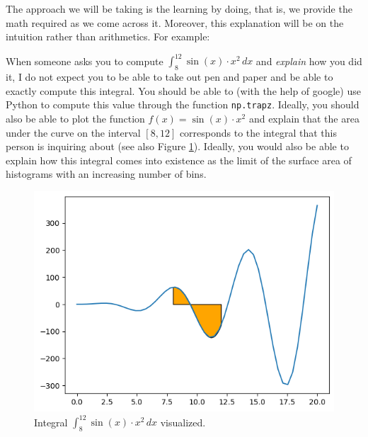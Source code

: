 \documentclass[10pt]{extarticle}
\newcommand{\<}{\langle}
\renewcommand{\>}{\rangle}
\theoremstyle{mystyle}{\newtheorem*{remark}{Remark}}
\theoremstyle{mystyle}{\newtheorem*{remarks}{Remarks}}
\theoremstyle{mystyle}{\newtheorem*{example}{Example}}
\theoremstyle{mystyle}{\newtheorem*{examples}{Examples}}
\theoremstyle{definition}{\newtheorem*{exercise}{Exercise}}
\theoremstyle{warn}
\begin{document}
\begin{remark}
The approach we will be taking is the learning by doing, that is, we provide the math required as we come across it. Moreover, this explanation will be on the intuition rather than arithmetics. For example:

When someone asks you to compute $\int_8^12 \sin(x) \cdot x^2 \, dx$ and \textit{explain} how you did it, I do not expect you to be able to take out pen and paper and be able to exactly compute this integral. You should be able to (with the help of google) use Python to compute this value through the function \texttt{np.trapz}. Ideally, you should also be able to plot the function $f(x) = \sin(x) \cdot x^2$ and explain that the area under the curve on the interval $[8,12]$ corresponds to the integral that this person is inquiring about (see also Figure \ref{fig6.1:integral}). Ideally, you would also be able to explain how this integral comes into existence as the limit of the surface area of histograms with an increasing number of bins.
\end{remark}

\begin{figure}
\begin{center}
\includegraphics[scale=0.4]{figures/6.1_integral.png}
\caption{Integral $\int_8^12 \sin(x) \cdot x^2 \, dx$ visualized.} \label{fig6.1:integral}
\end{center}
\end{figure}
\end{document}
